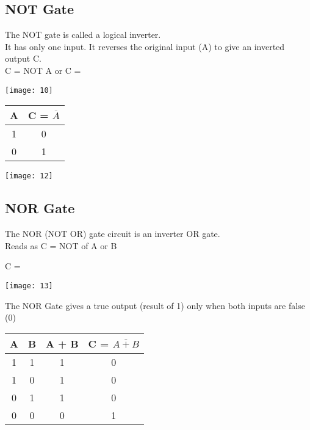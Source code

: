 \documentclass{article}
\begin{document}
\subsection{NOT Gate}
The NOT gate is called a logical inverter. \\
It has only one input. It reverses the original input (A) to give an inverted output C. \\

\color{red}C = NOT A or C = \\ \color{black}
\begin{center}
	\texttt{[image: 10]}
\end{center}
\begin{table}[h!]
	\begin{center}
		\begin{tabular}{c|c}
			\textbf{A} & 
			\textbf{C = $\overline{A}$}\\
			\hline
			1 & 0 \\
			\hline
			0 & 1 \\
			\hline
		\end{tabular}
	\end{center}
\end{table} 
\begin{center}
	\texttt{[image: 12]}
\end{center}

\subsection{NOR Gate}
The NOR (NOT OR) gate circuit is an inverter OR gate. \\

\color{red}Reads as C = NOT of A or B \\ \color{black}

C = \begin{center}
	\texttt{[image: 13]}
\end{center}

The NOR Gate gives a true output (result of 1) only when both inputs are false (0) \\
\begin{table}[h!]
	\begin{center}
		\begin{tabular}{c|c|c|c}
			\textbf{A} & \textbf{B} &
			\textbf{A + B} & \textbf{C = $\overline{A + B}$}\\
			\hline
			1 & 1 & 1 & 0 \\
			\hline
			1 & 0 & 1 & 0 \\
			\hline
			0 & 1 & 1 & 0\\
			\hline
			0 & 0 & 0 & 1\\
			\hline
		\end{tabular}
	\end{center}
\end{table} \\
\end{document}
